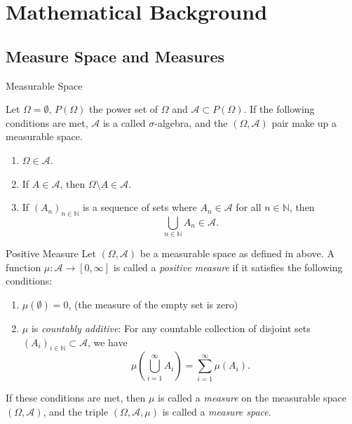 \chapter{Mathematical Background}
\label{appendix:mathematical-notation}

\section{Measure Space and Measures}
\label{section:measurable_space}
\begin{note}
    {Measurable Space}

    Let $\Omega = \emptyset$, $P(\Omega)$ the power set of $\Omega$ and $\mathcal{A} \subset P(\Omega)$. If the following conditions are met, $\mathcal{A}$ is a called $\sigma$-algebra, and the $(\Omega, \mathcal{A})$ pair make up a measurable space.
    \begin{enumerate}
        \item $\Omega \in \mathcal{A}$.
        \item If $A \in \mathcal{A}$, then $\Omega \setminus A \in \mathcal{A}$.
        \item If $(A_n)_{n \in \mathbb{N}}$ is a sequence of sets where $A_n \in \mathcal{A}$ for all $n \in \mathbb{N}$, then 
        \begin{equation*}
            \bigcup_{n \in \mathbb{N}} A_n \in \mathcal{A}.
        \end{equation*}
    \end{enumerate}
\end{note}

\begin{note}
    {Positive Measure}
    Let $(\Omega, \mathcal{A})$ be a measurable space as defined in above. A function $\mu: \mathcal{A} \to [0, \infty]$ is called a \textit{positive measure} if it satisfies the following conditions:

    \begin{enumerate}
        \item $\mu(\emptyset) = 0$, (the measure of the empty set is zero)
        \item $\mu$ is \textit{countably additive}: For any countable collection of disjoint sets $(A_i)_{i \in \mathbb{N}} \subset \mathcal{A}$, we have
        \begin{equation*}
            \mu\left( \bigcup_{i=1}^{\infty} A_i \right) = \sum_{i=1}^{\infty} \mu(A_i).
        \end{equation*}
    \end{enumerate}
    
    If these conditions are met, then $\mu$ is called a \textit{measure} on the measurable space $(\Omega, \mathcal{A})$, and the triple $(\Omega, \mathcal{A}, \mu)$ is called a \textit{measure space}.
\end{note}



